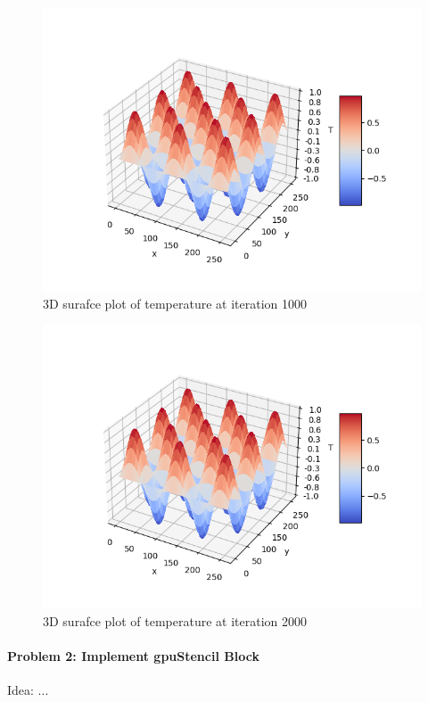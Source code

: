 \documentclass[12pt,letterpaper,twoside]{article}
\begin{document}
\begin{figure}[h]
    \center
    \includegraphics[scale=0.7]{global1000.png}
    \caption{3D surafce plot of temperature at iteration 1000}
\end{figure}

\begin{figure}[h]
    \center
    \includegraphics[scale=0.7]{global2000.png}
    \caption{3D surafce plot of temperature at iteration 2000}
\end{figure}


\paragraph{Problem 2: Implement gpuStencil Block } Idea: ...
\end{document}
